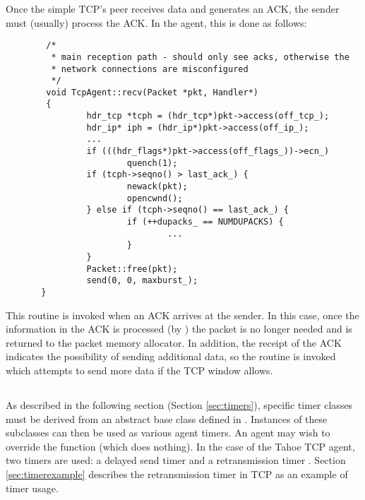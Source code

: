 Once the simple TCP's peer receives data and generates an ACK, the
sender must (usually) process the ACK.
In the  agent, this is done as follows:
\begin{small}
\begin{verbatim}
        /*
         * main reception path - should only see acks, otherwise the
         * network connections are misconfigured
         */
        void TcpAgent::recv(Packet *pkt, Handler*)
        {
                hdr_tcp *tcph = (hdr_tcp*)pkt->access(off_tcp_);
                hdr_ip* iph = (hdr_ip*)pkt->access(off_ip_);
                ...
                if (((hdr_flags*)pkt->access(off_flags_))->ecn_)
                        quench(1);
                if (tcph->seqno() > last_ack_) {
                        newack(pkt);
                        opencwnd();
                } else if (tcph->seqno() == last_ack_) {
                        if (++dupacks_ == NUMDUPACKS) {
                                ...
                        }
                }
                Packet::free(pkt);
                send(0, 0, maxburst_);
       }
\end{verbatim}
\end{small}
This routine is invoked when an ACK arrives at the sender.
In this case, once the information in the ACK is processed (by )
the packet is no longer needed and is returned to the packet memory
allocator.
In addition, the receipt of the ACK indicates the possibility of sending
additional data, so the  routine is
invoked which attempts to send more data if the TCP window allows.

\subsection{}

As described in the following section (Section \ref{sec:timers}), specific
timer classes must be derived from an abstract base class 
 defined in .  Instances of these
subclasses can then be used as various agent timers.
An agent may wish to override the  function (which does 
nothing).  In the case of the Tahoe TCP agent, two timers are used: a delayed
send timer  and a retransmission timer .
Section \ref{sec:timerexample} describes the retransmission timer in TCP
as an example of timer usage.  

\section{}

